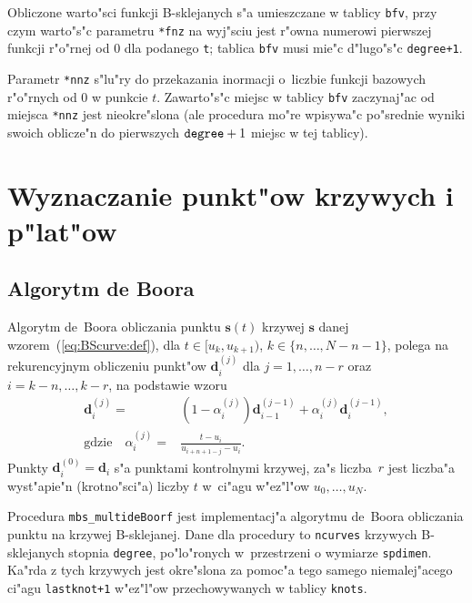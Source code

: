 Obliczone warto"sci funkcji B-sklejanych s"a umieszczane w tablicy
\texttt{bfv}, przy czym warto"s"c parametru \texttt{*fnz} na wyj"sciu jest
r"owna numerowi pierwszej funkcji r"o"rnej od $0$ dla podanego \texttt{t};
tablica \texttt{bfv} musi mie"c d"lugo"s"c \texttt{degree+1}.

Parametr \texttt{*nnz} s"lu"ry do przekazania inormacji o~liczbie funkcji
bazowych r"o"rnych od $0$ w punkcie $t$. Zawarto"s"c miejsc w tablicy
\texttt{bfv} zaczynaj"ac od miejsca \texttt{*nnz} jest nieokre"slona
(ale procedura mo"re wpisywa"c po"srednie wyniki swoich oblicze"n do
pierwszych $\mbox{\texttt{degree}}+1$ miejsc w tej tablicy).


\newpage
\section{Wyznaczanie punkt"ow krzywych i p"lat"ow}

\subsection{Algorytm de Boora}

Algorytm de~Boora obliczania punktu $\bm{s}(t)$ krzywej $\bm{s}$ danej
wzorem~(\ref{eq:BScurve:def}), dla $t\in[u_k,u_{k+1})$,
$k\in\{n,\ldots,N-n-1\}$, polega na rekurencyjnym obliczeniu
punkt"ow $\bm{d}^{(j)}_i$ dla $j=1,\ldots,n-r$ oraz $i=k-n,\ldots,k-r$,
na podstawie wzoru
\begin{align}
  \bm{d}^{(j)}_i ={}&
  (1-\alpha^{(j)}_i)\bm{d}^{(j-1)}_{i-1} + \alpha^{(j)}_i\bm{d}^{(j-1)}_i, \\
  \mbox{gdzie}\quad \alpha^{(j)}_i ={}& \frac{t-u_i}{u_{i+n+1-j}-u_i}. \nonumber
\end{align}
Punkty $\bm{d}^{(0)}_i=\bm{d}_i$ s"a punktami kontrolnymi krzywej,
za"s liczba~$r$ jest liczba"a wyst"apie"n (krotno"sci"a) liczby $t$ w~ci"agu
w"ez"l"ow $u_0,\ldots,u_N$.

\vspace{\bigskipamount}
\begin{sloppypar}
Procedura \texttt{mbs\_multideBoorf} jest implementacj"a
algorytmu de~Boora
obliczania punk\-tu na krzywej B-sklejanej. Dane dla procedury to
\texttt{ncurves} krzywych B-sklejanych stopnia \texttt{degree}, po"lo"ronych
w~przestrzeni o wymiarze \texttt{spdimen}. Ka"rda z tych krzywych jest
okre"slona za pomoc"a tego samego niemalej"acego ci"agu \texttt{lastknot+1}
w"ez"l"ow przechowywanych w tablicy \texttt{knots}.
\end{sloppypar}

